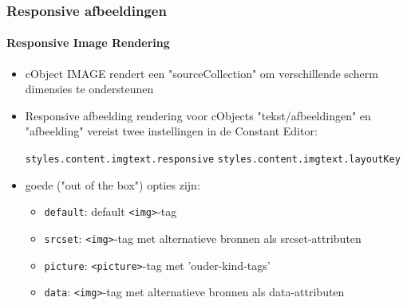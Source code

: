 \begin{frame}[fragile]
	\frametitle{Responsive afbeeldingen}
	\framesubtitle{Responsive Image Rendering}

	\begin{itemize}
		\item cObject IMAGE rendert een "sourceCollection" om verschillende scherm dimensies te ondersteunen
		\item Responsive afbeelding rendering voor cObjects "tekst/afbeeldingen" en "afbeelding" vereist twee instellingen in de Constant Editor:

			\texttt{styles.content.imgtext.responsive}\newline
			\texttt{styles.content.imgtext.layoutKey}

		\item goede ("out of the box") opties zijn:

			\begin{itemize}
				\item \texttt{default}:	\tabto{2cm} default \texttt{<img>}-tag
				\item \texttt{srcset}:	\tabto{2cm} \texttt{<img>}-tag met alternatieve bronnen als srcset-attributen
				\item \texttt{picture}:	\tabto{2cm} \texttt{<picture>}-tag met 'ouder-kind-tags'
				\item \texttt{data}:	\tabto{2cm} \texttt{<img>}-tag met alternatieve bronnen als data-attributen 
			\end{itemize}

	\end{itemize}

\end{frame}


